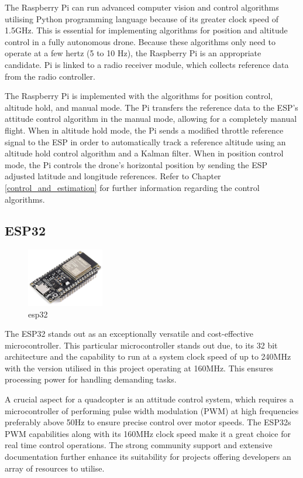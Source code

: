 \documentclass{report}
\begin{document}
The Raspberry Pi can run advanced computer vision and control algorithms
utilising Python programming language because of its greater clock speed of
1.5GHz. This is essential for implementing algorithms for position and altitude
control in a fully autonomous drone. Because these algorithms only need to
operate at a few hertz (5 to 10 Hz), the Raspberry Pi is an appropriate
candidate. Pi is linked to a radio receiver module, which collects reference
data from the radio controller.

The Raspberry Pi is implemented with the algorithms for position control,
altitude hold, and manual mode. The Pi transfers the reference data to the ESP's
attitude control algorithm in the manual mode, allowing for a completely manual
flight. When in altitude hold mode, the Pi sends a modified throttle reference
signal to the ESP in order to automatically track a reference altitude using an
altitude hold control algorithm and a Kalman filter. When in position control
mode, the Pi controls the drone's horizontal position by sending the ESP
adjusted latitude and longitude references. Refer to Chapter
\ref{control_and_estimation} for further information regarding the control
algorithms. 

\subsection{ESP32}
\begin{figure}[H]
  \centering
  \includegraphics[width=0.3\textwidth]{Pictures/esp32.png}
  \caption{esp32}
  \label{fig:esp32}
\end{figure}
The ESP32 stands out as an exceptionally versatile and cost-effective
microcontroller. This particular microcontroller stands out due, to its 32 bit
architecture and the capability to run at a system clock speed of up to 240MHz
with the version utilised in this project operating at 160MHz. This ensures
processing power for handling demanding tasks.

A crucial aspect for a quadcopter is an attitude control system, which requires
a microcontroller of performing pulse width modulation (PWM) at high frequencies
preferably above 50Hz to ensure precise control over motor speeds. The ESP32s
PWM capabilities along with its 160MHz clock speed make it a great choice for
real time control operations. The strong community support and extensive
documentation further enhance its suitability for projects offering developers
an array of resources to utilise.
\end{document}
